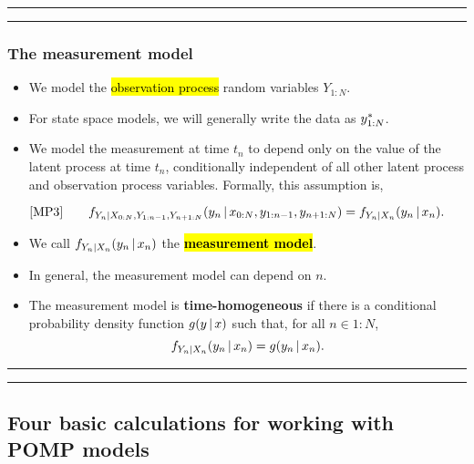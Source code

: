 \documentclass[]{article}
\begin{document}
\begin{center}\rule{0.5\linewidth}{\linethickness}\end{center}

\begin{center}\rule{0.5\linewidth}{\linethickness}\end{center}

\subsubsection{The measurement model}\label{the-measurement-model}

\begin{itemize}
\item
  We model the \hl{observation process} random variables \(Y_{1:N}\).
\item
  For state space models, we will generally write the data as
  \(y_{1:N}^*\).
\item
  We model the measurement at time \(t_n\) to depend only on the value
  of the latent process at time \(t_n\), conditionally independent of
  all other latent process and observation process variables. Formally,
  this assumption is,
\end{itemize}
$$\text{[MP3]}
\quad\quad f_{Y_n|X_{0:N},Y_{1:n-1},Y_{n+1:N}}(y_n{\, | \,} x_{0:N},y_{1:n-1},y_{n+1:N}) = f_{Y_n|X_n}(y_n{\, | \,} x_{n}).$$

\begin{itemize}
\item
  We call \(f_{Y_n|X_n}(y_n{\, | \,} x_{n})\) the \hl{\textbf{measurement
  model}}.
\item
  In general, the measurement model can depend on \(n\).
\item
  The measurement model is \textbf{time-homogeneous} if there is a
  conditional probability density function \(g(y{\, | \,} x)\) such that,
  for all \(n\in 1:N\),
  \[ f_{Y_n|X_n}(y_n{\, | \,} x_{n})= g(y_n{\, | \,} x_n).\]
\end{itemize}

\begin{center}\rule{0.5\linewidth}{\linethickness}\end{center}

\begin{center}\rule{0.5\linewidth}{\linethickness}\end{center}

\subsection{Four basic calculations for working with POMP
models}\label{four-basic-calculations-for-working-with-pomp-models}
\end{document}
